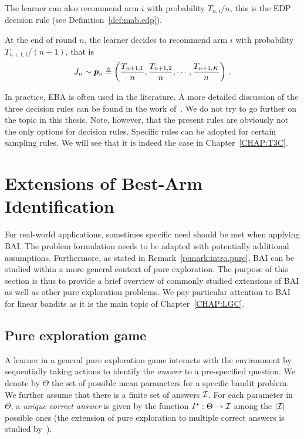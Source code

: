 The learner can also recommend arm $i$ with probability $T_{n,i}/n$, this is the EDP decision rule (see Definition~\ref{def:mab.edp}).

\begin{definition}
\begin{leftbar}[defnbar]\label{def:mab.edp}
    At the end of round $n$, the learner decides to recommend arm $i$ with probability $T_{n+1,i}/(n+1)$, that is
    \[
        J_n \sim \boldsymbol{p}_{n}\triangleq\left(\frac{T_{n+1,1}}{n},\frac{T_{n+1,2}}{n},\cdots,\frac{T_{n+1,K}}{n}\right)\,.
    \]
\end{leftbar}
\end{definition}

In practice, EBA is often used in the literature. A more detailed discussion of the three decision rules can be found in the work of~\cite{bubeck2009pure}. We do not try to go further on the topic in this thesis. Note, however, that the present rules are obviously not the only options for decision rules. Specific rules can be adopted for certain sampling rules. We will see that it is indeed the case in Chapter~\ref{CHAP:T3C}.

\section{Extensions of Best-Arm Identification}\label{sec:mab.extensions}

For real-world applications, sometimes specific need should be met when applying BAI. The problem formulation needs to be adapted with potentially additional assumptions. Furthermore, as stated in Remark~\ref{remark:intro.pure}, BAI can be studied within a more general context of pure exploration. The purpose of this section is thus to provide a brief overview of commonly studied extensions of BAI as well as other pure exploration problems. We pay particular attention to BAI for linear bandits as it is the main topic of Chapter~\ref{CHAP:LGC}.

\subsection{Pure exploration game}\label{sec:mab.extensions.pure}

A learner in a general pure exploration game interacts with the environment by sequentially taking actions to identify the \emph{answer} to a pre-specified question. We denote by $\Theta$ the set of possible mean parameters for a specific bandit problem. We further assume that there is a finite set of answers $\mathcal{I}$. For each parameter in $\Theta$, a \emph{unique correct answer} is given by the function $I^\star:\Theta \to \mathcal{I}$ among the $|\mathcal{I}|$ possible ones (the extension of pure exploration to multiple correct answers is studied by~\citealt{degenne2019pure}).

